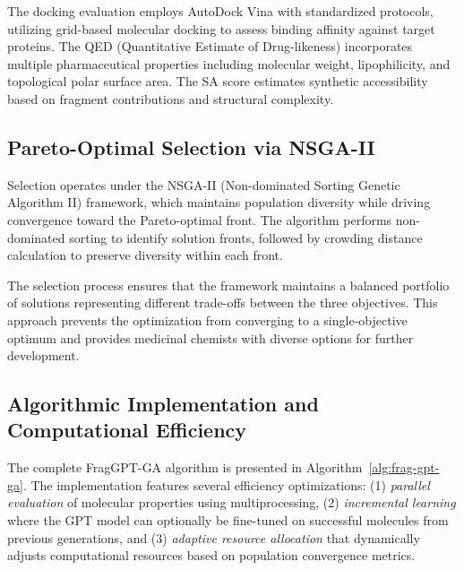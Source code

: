 \documentclass[lettersize,journal]{IEEEtran}
\begin{document}
The docking evaluation employs AutoDock Vina with standardized protocols, utilizing grid-based molecular docking to assess binding affinity against target proteins. The QED (Quantitative Estimate of Drug-likeness) incorporates multiple pharmaceutical properties including molecular weight, lipophilicity, and topological polar surface area. The SA score estimates synthetic accessibility based on fragment contributions and structural complexity.

\subsection{Pareto-Optimal Selection via NSGA-II}

Selection operates under the NSGA-II (Non-dominated Sorting Genetic Algorithm II) framework, which maintains population diversity while driving convergence toward the Pareto-optimal front. The algorithm performs non-dominated sorting to identify solution fronts, followed by crowding distance calculation to preserve diversity within each front.

The selection process ensures that the framework maintains a balanced portfolio of solutions representing different trade-offs between the three objectives. This approach prevents the optimization from converging to a single-objective optimum and provides medicinal chemists with diverse options for further development.

\subsection{Algorithmic Implementation and Computational Efficiency}

The complete FragGPT-GA algorithm is presented in Algorithm~\ref{alg:frag-gpt-ga}. The implementation features several efficiency optimizations: (1) \textit{parallel evaluation} of molecular properties using multiprocessing, (2) \textit{incremental learning} where the GPT model can optionally be fine-tuned on successful molecules from previous generations, and (3) \textit{adaptive resource allocation} that dynamically adjusts computational resources based on population convergence metrics.
\end{document}
